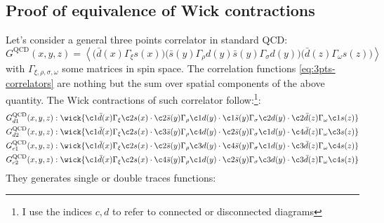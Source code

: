 \documentclass[english, LaM, oneside, noexaminfo]{sapthesis}
\newcommand{\la}{\langle}
\newcommand{\ra}{\rangle}
\begin{document}
\subsection{Proof of equivalence of Wick contractions}
\noindent
Let's consider a general three points correlator in standard QCD:
\begin{equation*}
    G^\text{QCD}(x,y,z) = \left\la \bigg(\bar d(x) \Gamma_\xi s(x)\bigg) \bigg(\bar s(y) \Gamma_\rho d(y) \bar s(y) \Gamma_\sigma d(y)\bigg) \bigg(\bar d(z) \Gamma_\omega s(z)\bigg) \right\ra
\end{equation*}
with $\Gamma_{\xi,\rho,\sigma,\omega}$ some matrices in spin space.
The correlation functions \ref{eq:3pts-correlators} are nothing but the sum over spatial components of the above quantity.
The Wick contractions of such correlator follow:\footnote{I use the indices $c,d$ to refer to connected or disconnected diagrams}:
\begin{equation*}
    \begin{split}
        & G_{d1}^\text{QCD}(x,y,z): \wick{\c1{\bar d (x)} \Gamma_\xi \c2{s(x)} \cdot \c2{\bar s (y)} \Gamma_\rho \c1{d (y)} \cdot \c1{\bar s (y)} \Gamma_\sigma \c2{d(y)} \cdot \c2{\bar d (z)} \Gamma_\omega \c1{s (z)} } \\
        & G_{d2}^\text{QCD}(x,y,z): \wick{\c1{\bar d (x)} \Gamma_\xi \c2{s(x)} \cdot \c3{\bar s (y)} \Gamma_\rho \c4{d (y)} \cdot \c2{\bar s (y)} \Gamma_\sigma \c1{d(y)} \cdot \c4{\bar d (z)} \Gamma_\omega \c3{s (z)} } \\
        & G_{c1}^\text{QCD}(x,y,z): \wick{\c1{\bar d (x)} \Gamma_\xi \c2{s(x)} \cdot \c2{\bar s (y)} \Gamma_\rho \c3{d (y)} \cdot \c4{\bar s (y)} \Gamma_\sigma \c1{d(y)} \cdot \c3{\bar d (z)} \Gamma_\omega \c4{s (z)} } \\
        & G_{c2}^\text{QCD}(x,y,z): \wick{\c1{\bar d (x)} \Gamma_\xi \c2{s(x)} \cdot \c4{\bar s (y)} \Gamma_\rho \c1{d (y)} \cdot \c2{\bar s (y)} \Gamma_\sigma \c3{d(y)} \cdot \c3{\bar d (z)} \Gamma_\omega \c4{s (z)} } \\
    \end{split}
\end{equation*}
They generates single or double traces functions:
\end{document}
